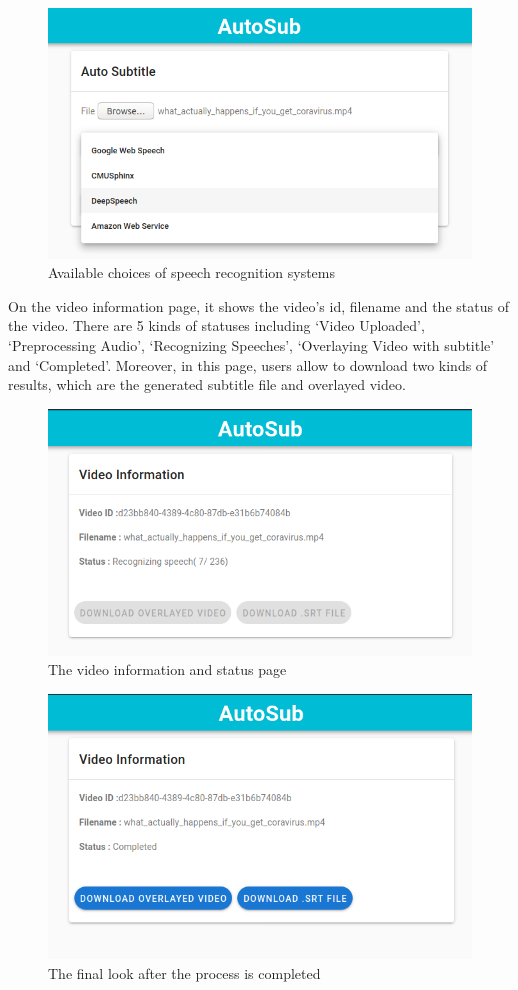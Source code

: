 \documentclass[natbib]{muthesis}
\begin{document}
\begin{figure}[H]
\centering
\captionsetup{justification=centering}
\includegraphics[width=0.8\linewidth]{images/main-with-options}
\caption{Available choices of speech recognition systems}
\label{fig:frontend-main-with-options}
\end{figure}
 
 On the video information page, it shows the video's id, filename and the status of the video. There are 5 kinds of statuses including `Video Uploaded', `Preprocessing Audio', `Recognizing Speeches', `Overlaying Video with subtitle' and `Completed'. Moreover, in this page, users allow to download two kinds of results, which are the generated subtitle file and overlayed video.
 \begin{figure}[H]
 	\centering
 	\captionsetup{justification=centering}
 	\includegraphics[width=0.8\linewidth]{images/info-recognizing}
 	\caption{The video information and status page}
 	\label{fig:frontend-info}
 \end{figure}

 \begin{figure}[H]
 	\centering
 	\captionsetup{justification=centering}
 	\includegraphics[width=0.8\linewidth]{images/info-completed}
 	\caption{The final look after the process is completed}
 	\label{fig:frontend-info-complete}
 \end{figure}
 
\end{document}
